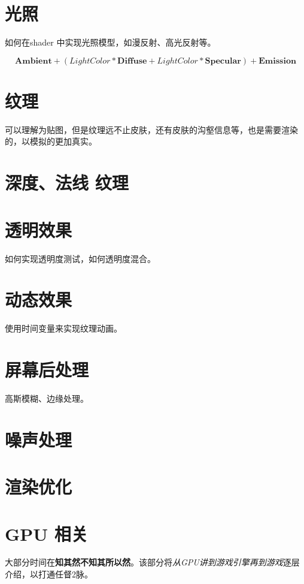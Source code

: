 \documentclass[UTF8,a4paper,12pt]{ctexbook}
\begin{document}
\chapter{光照}
	如何在shader 中实现光照模型，如漫反射、高光反射等。

	$$\mathbf{Ambient} + (Light Color * \mathbf{Diffuse} + Light  Color* \mathbf{Specular}) + \mathbf{Emission}$$

\chapter{纹理}
	可以理解为贴图，但是纹理远不止皮肤，还有皮肤的沟壑信息等，也是需要渲染的，以模拟的更加真实。

\chapter{深度、法线 纹理}
	


\chapter{透明效果}
	如何实现透明度测试，如何透明度混合。


\chapter{动态效果}
	使用时间变量来实现纹理动画。


\chapter{屏幕后处理}
	高斯模糊、边缘处理。



\chapter{噪声处理}



\chapter{渲染优化}

\chapter{GPU 相关}
	大部分时间在\textbf{知其然不知其所以然}。该部分将\textit{从GPU讲到游戏引擎再到游戏}逐层介绍，以打通任督2脉。 
\end{document}
